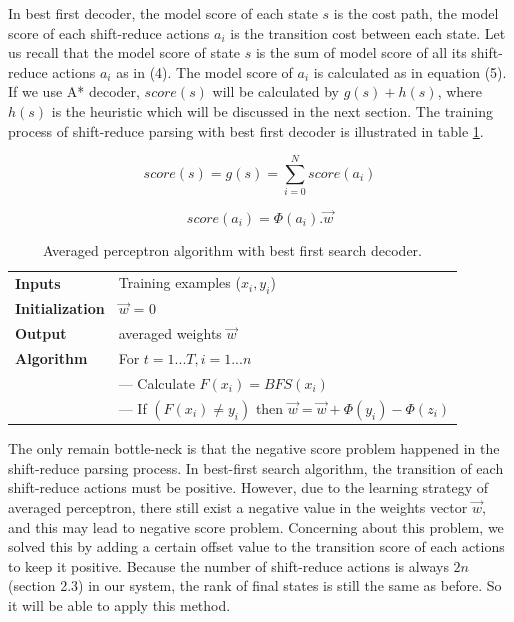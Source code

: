 In best first decoder, the model score of each state $s$ is the cost path, the model score of each shift-reduce actions $a_i$ is the transition cost between each state. Let us recall that the model score of state $s$ is the sum of model score of all its shift-reduce actions $a_i$ as in (4). The model score of $a_i$ is calculated as in equation (5). If we use A* decoder, $score(s)$ will be calculated by $g(s)+h(s)$, where $h(s)$ is the heuristic which will be discussed in the next section. The training process of shift-reduce parsing with best first decoder is illustrated in table \ref{best first perceptron}.

\begin{equation}
	score(s) = g(s) = \sum_{i = 0}^{N} score(a_i)
\end{equation}

\begin{equation}
	score(a_i) = \Phi(a_i).\vec{w}
\end{equation}

\begin{table}[t]
	\begin{center}
		\caption{\label{best first perceptron} Averaged perceptron algorithm with best first search decoder.}
		\begin{tabular}{|l|l|}
			\hline
			\bf Inputs & Training examples ($x_i,y_i$) \\
			\bf Initialization & $\vec{w}$ = 0 \\
			\bf Output & averaged weights $\vec{w}$ \\
			\hline
			\bf Algorithm 	& For $t = 1 ...T, i = 1 ...n$ \\
			& --- Calculate $F(x_i) = BFS(x_i)$ \\
			& --- If $(F(x_i) \neq y_i)$ then $\vec{w} = \vec{w} + \Phi(y_i) - \Phi(z_i)$ \\
			\hline							
		\end{tabular}
	\end{center}
\end{table}

The only remain bottle-neck is that the negative score problem happened in the shift-reduce parsing process. In best-first search algorithm, the transition of each shift-reduce actions must be positive. However, due to the learning strategy of averaged perceptron, there still exist a negative value in the weights vector $\vec{w}$, and this may lead to negative score problem. Concerning about this problem, we solved this by adding a certain offset value to the transition score of each actions to keep it positive. Because the number of shift-reduce actions is always $2n$ (section 2.3) in our system, the rank of final states is still the same as before. So it will be able to apply this method.

